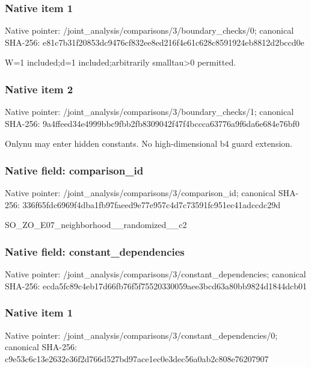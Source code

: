 \documentclass[10pt,a4paper]{article}
\begin{document}
\subsubsection{Native item 1}
Native pointer: /joint\_\allowbreak{}analysis/comparisons/3/boundary\_\allowbreak{}checks/0; canonical SHA-256: e81c7b31f20853dc9476cf832ee8ed216f4e61c628c8591924eb8812d2bccd0e

\begingroup\raggedright\sloppy W=\allowbreak{}1 included;\allowbreak{}d=\allowbreak{}1 included;\allowbreak{}arbitrarily smalltau>0 permitted.\par\endgroup

\subsubsection{Native item 2}
Native pointer: /joint\_\allowbreak{}analysis/comparisons/3/boundary\_\allowbreak{}checks/1; canonical SHA-256: 9a4ffeed34e4999bbc9fbb2fb8309042f47f4bccca63776a9f6da6e684e76bf0

\begingroup\raggedright\sloppy Onlynu may enter hidden constants. No high-dimensional b4 guard extension.\par\endgroup

\subsubsection{Native field: comparison\_\allowbreak{}id}
Native pointer: /joint\_\allowbreak{}analysis/comparisons/3/comparison\_\allowbreak{}id; canonical SHA-256: 336f65fdc6969f4dba1fb97faeed9e77e957c4d7c73591fc951ec41adccdc29d

\begingroup\raggedright\sloppy SO\_\allowbreak{}ZO\_\allowbreak{}E07\_\allowbreak{}neighborhood\_\allowbreak{}\_\allowbreak{}randomized\_\allowbreak{}\_\allowbreak{}c2\par\endgroup

\subsubsection{Native field: constant\_\allowbreak{}dependencies}
Native pointer: /joint\_\allowbreak{}analysis/comparisons/3/constant\_\allowbreak{}dependencies; canonical SHA-256: ecda5fc89c4eb17d66fb76f5f75520330059aee3bcd63a80bb9824d1844dcb01

\subsubsection{Native item 1}
Native pointer: /joint\_\allowbreak{}analysis/comparisons/3/constant\_\allowbreak{}dependencies/0; canonical SHA-256: c9e53c6c13e2632e36f2d766d527bd97ace1ec0e3dec56a0ab2c808e76207907
\end{document}
